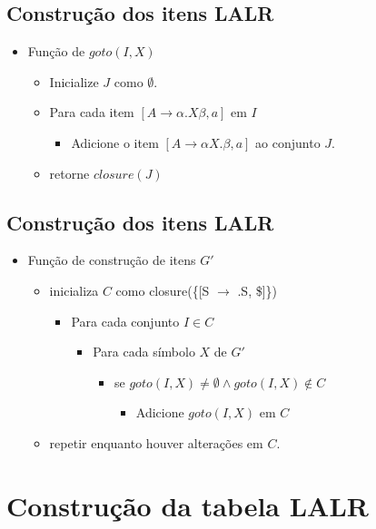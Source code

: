 \documentclass[11pt]{article}
\begin{document}
\subsection*{Construção dos itens LALR}
\label{sec:org142c089}

\begin{itemize}
\item Função de \(goto(I,X)\)
\begin{itemize}
\item Inicialize \(J\) como \(\emptyset\).
\item Para cada item \([A\to \alpha .X \beta,a]\) em \(I\)
\begin{itemize}
\item Adicione o item \([A \to \alpha X. \beta, a]\) ao conjunto \(J\).
\end{itemize}
\item retorne \(closure(J)\)
\end{itemize}
\end{itemize}
\subsection*{Construção dos itens LALR}
\label{sec:orgbeb706f}

\begin{itemize}
\item Função de construção de itens \(G'\)
\begin{itemize}
\item inicializa \(C\) como closure(\{[S \(\to\) .S, \$]\})
\begin{itemize}
\item Para cada conjunto \(I \in C\)
\begin{itemize}
\item Para cada símbolo \(X\) de \(G'\)
\begin{itemize}
\item se \(goto(I,X) \neq \emptyset \land goto(I,X) \not\in C\)
\begin{itemize}
\item Adicione \(goto(I,X)\) em \(C\)
\end{itemize}
\end{itemize}
\end{itemize}
\end{itemize}
\item repetir enquanto houver alterações em \(C\).
\end{itemize}
\end{itemize}
\section*{Construção da tabela LALR}
\label{sec:org78be849}
\end{document}
